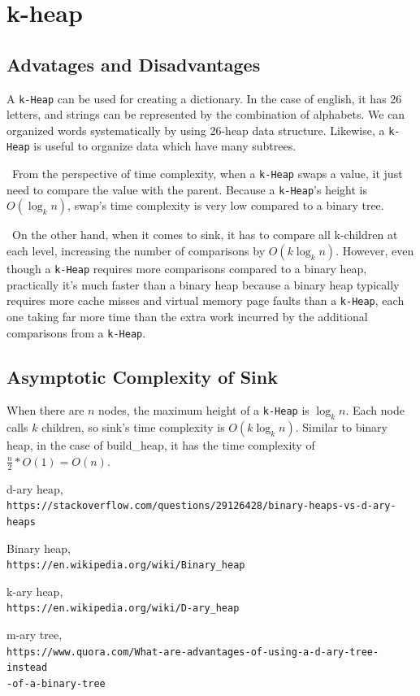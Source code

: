 \documentclass[12pt]{article}
\begin{document}
\section{k-heap}
\subsection{Advatages and Disadvantages}
A \verb|k-Heap| can be used for creating a dictionary. In the case of english, it has 26 letters, and strings can be represented by the combination of alphabets. We can organized words systematically by using 26-heap data structure. Likewise, a \verb|k-Heap| is useful to organize data which have many subtrees. \cite{wikipedia2}

~\newline\noindent From the perspective of time complexity, when a \verb|k-Heap| swaps a value, it just need to compare the value with the parent. Because a \verb|k-Heap|'s height is $O(\log_{k}{n})$, swap's time complexity is very low compared to a binary tree.

~\newline\noindent On the other hand, when it comes to sink, it has to compare all k-children at each level, increasing the number of comparisons by $O(k\log_{k}{n})$. However, even though a \verb|k-Heap| requires more comparisons compared to a binary heap, practically it's much faster than a binary heap because a binary heap typically requires more cache misses and virtual memory page faults than a \verb|k-Heap|, each one taking far more time than the extra work incurred by the additional comparisons from a \verb|k-Heap|. \cite{stackoverflow}

\subsection{Asymptotic Complexity of Sink}
When there are $n$ nodes, the maximum height of a \verb|k-Heap| is 
$\log_{k}{n}$. Each node calls $k$ children, so sink's time complexity
is $O(k\log_{k}{n})$. Similar to binary heap, 
in the case of build\_heap, it has the time complexity of
$ \frac{n}{2} * O(1) = O(n) $. \cite{Geeks}



\newpage 

\begin{thebibliography}{9}
d-ary heap,\\
\texttt{https://stackoverflow.com/questions/29126428/binary-heaps-vs-d-ary-heaps}

Binary heap,\\
\texttt{https://en.wikipedia.org/wiki/Binary\_heap}

k-ary heap,\\
\texttt{https://en.wikipedia.org/wiki/D-ary\_heap}

m-ary tree,\\
\texttt{https://www.quora.com/What-are-advantages-of-using-a-d-ary-tree-instead\\-of-a-binary-tree}

\end{thebibliography}
\end{document}
